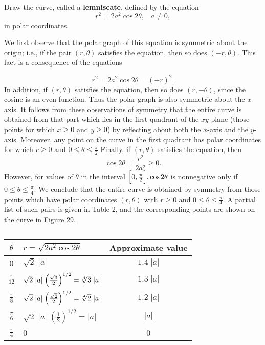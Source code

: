 \begin{example} Draw the curve, called a \textbf{lemniscate}, defined by the equation
$$
r^2 = 2a^2 \cos 2\theta, \;\;\; a \neq 0, 
$$
\noindent in polar coordinates.

We first observe that the polar graph of this equation is symmetric about the origin; i.e., if the pair $(r, \theta)$ satisfies the equation, then so does $(-r, \theta)$. This fact is a consequence of the equations 

$$
r^2 = 2a^2 \cos 2\theta = (-r)^2.
$$
\noindent In addition, if $(r, \theta)$ satisfies the equation, then so does $(r, -\theta)$, since the cosine is an even function. Thus the polar graph is also symmetric about the $x$-axis. It follows from these observations of symmetry that the entire curve
is obtained from that part which lies in the first quadrant of the $xy$-plane (those points for which $x \geq 0$ and $y \geq 0$) by reflecting about both the $x$-axis and the $y$-axis. Moreover, any point on the curve in the first quadrant has polar coordinates for which $r \geq 0$ and $0 \leq \theta \leq \frac{\pi}{2}$ Finally, if $(r, \theta)$ satisfies the equation, then
$$
\cos 2\theta = \frac{r^2}{2a^2} \geq 0 .
$$
\noindent However, for values of $\theta$ in the interval $\Bigl[0, \frac{\pi}{2}\Bigr], \cos 2\theta$ is nonnegative only if $0 \leq \theta \leq \frac{\pi}{4}$. We conclude that the entire curve is obtained by symmetry from those points which have polar coordinates $(r, \theta)$ with $r \geq 0$ and $0 \leq \theta \leq \frac{\pi}{4}$. A partial list of such pairs is given in Table 2, and the corresponding points are shown on the curve in Figure 29.

\setcounter{table}{1}
\begin{table}\label{table 10.2}
\centering
\begin{tabular}{c|l|c} \hline

$\theta$            & $r = \sqrt{2a^2 \cos{2\theta}}$ & Approximate value      \vspace {1ex} \\ \hline
0                       & $\sqrt2 \;|a|$                                                           & $1.4\;|a|$ \vspace {1ex} \\
$\frac{\pi}{12}$ & $\sqrt2 \;|a|\;\Bigl(\frac{\sqrt3}{2}\Bigr)^{1/2} = \sqrt[4]{3} \;|a|$ & $1.3\;|a|$ \vspace {1ex} \\
$\frac{\pi}{8}$   & $\sqrt2 \;|a|\;\Bigl(\frac{\sqrt2}{2}\Bigr)^{1/2} = \sqrt[4]{2} \;|a|$ & $1.2\;|a|$ \vspace {1ex} \\
$\frac{\pi}{6}$   & $\sqrt2 \;|a|\;(\frac{1}{2})^{1/2} = |a|$                          & $|a|$   \vspace {1ex} \\
$\frac{\pi}{4}$   & 0                                                                           & 0 \vspace {1ex} \\ \hline
\end{tabular}
\caption{}
\end{table}
\end{example}

